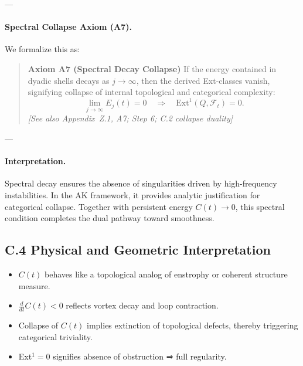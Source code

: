 \documentclass[11pt]{article}
\begin{document}
\begin{center}
\end{center}

---

\paragraph{Spectral Collapse Axiom (A7).}
We formalize this as:

\begin{quote}
\textbf{Axiom A7 (Spectral Decay Collapse)}  
If the energy contained in dyadic shells decays as \( j \to \infty \),  
then the derived Ext-classes vanish, signifying collapse of internal topological and categorical complexity:
\[
\lim_{j \to \infty} E_j(t) = 0 
\quad \Rightarrow \quad 
\mathrm{Ext}^1(Q, \mathcal{F}_t) = 0.
\]
\textit{[See also Appendix~Z.1, A7; Step 6; C.2 collapse duality]}
\end{quote}

---

\paragraph{Interpretation.}
Spectral decay ensures the absence of singularities driven by high-frequency instabilities.  
In the AK framework, it provides analytic justification for categorical collapse.  
Together with persistent energy \( C(t) \to 0 \), this spectral condition completes the dual pathway toward smoothness.



\subsection*{C.4 Physical and Geometric Interpretation}

\begin{itemize}
  \item $C(t)$ behaves like a topological analog of enstrophy or coherent structure measure.
  \item $\frac{d}{dt} C(t) < 0$ reflects vortex decay and loop contraction.
  \item Collapse of $C(t)$ implies extinction of topological defects, thereby triggering categorical triviality.
  \item Ext$^1 = 0$ signifies absence of obstruction ⇒ full regularity.
\end{itemize}
\end{document}
